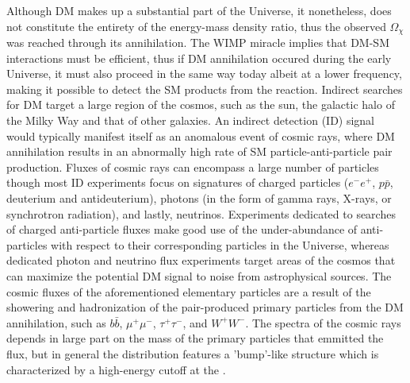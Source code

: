 Although DM makes up a substantial part of the Universe, it nonetheless, does not constitute the entirety of the energy-mass density ratio, thus the observed $\Omega_\chi$ was reached through its annihilation. The WIMP miracle implies that DM-SM interactions must be efficient, thus if DM annihilation occured during the early Universe, it must also proceed in the same way today albeit at a lower frequency, making it possible to detect the SM products from the reaction. Indirect searches for DM target a large region of the cosmos, such as the sun, the galactic halo of the Milky Way and that of other galaxies. An indirect detection (ID) signal would typically manifest itself as an anomalous event of cosmic rays, where DM annihilation results in an abnormally high rate of SM particle-anti-particle pair production. Fluxes of cosmic rays can encompass a large number of particles though most ID experiments focus on signatures of charged particles ($e^- e^+$, $p \bar{p}$, deuterium and antideuterium), photons (in the form of gamma rays, X-rays, or synchrotron radiation), and lastly, neutrinos. Experiments dedicated to searches of charged anti-particle fluxes make good use of the under-abundance of anti-particles with respect to their corresponding particles in the Universe, whereas dedicated photon and neutrino flux experiments target areas of the cosmos that can maximize the potential DM signal to noise from astrophysical sources. The cosmic fluxes of the aforementioned elementary particles are a result of the showering and hadronization of the pair-produced primary particles from the DM annihilation, such as $b\bar{b}$, $\mu^+\mu^-$, $\tau^+\tau^-$, and $W^+W^-$. The spectra of the cosmic rays depends in large part on the mass of the primary particles that emmitted the flux, but in general the distribution features a 'bump'-like structure which is characterized by a high-energy cutoff at the \mDM. 

